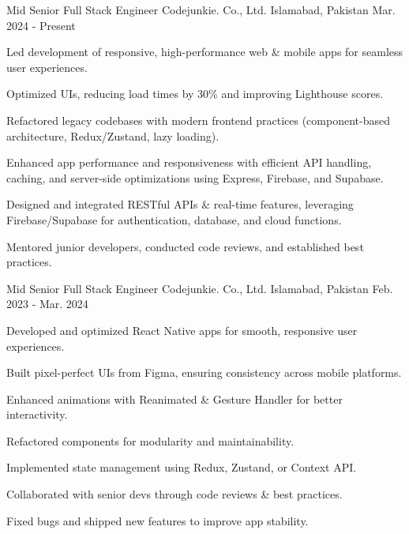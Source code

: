 

\begin{cventries}

  \cventry
    {Mid Senior Full Stack Engineer } %
    {Codejunkie. Co., Ltd.} %
    {Islamabad, Pakistan} %
    {Mar. 2024 - Present}%
    {
      \begin{cvitems} %
        \item {Led development of responsive, high-performance web \& mobile apps for seamless user experiences.}
        \item {Optimized UIs, reducing load times by 30\% and improving Lighthouse scores.}
        \item {Refactored legacy codebases with modern frontend practices (component-based architecture, Redux/Zustand, lazy loading).}
        \item {Enhanced app performance and responsiveness with efficient API handling, caching, and server-side optimizations using Express, Firebase, and Supabase.}
        \item {Designed and integrated RESTful APIs \& real-time features, leveraging Firebase/Supabase for authentication, database, and cloud functions.}
        \item {Mentored junior developers, conducted code reviews, and established best practices.}
      \end{cvitems}
    }

  \cventry
    {Mid Senior Full Stack Engineer } %
    {Codejunkie. Co., Ltd.} %
    {Islamabad, Pakistan} %
    {Feb. 2023 - Mar. 2024}%
    {
      \begin{cvitems} %
        \item {Developed and optimized React Native apps for smooth, responsive user experiences.}
        \item {Built pixel-perfect UIs from Figma, ensuring consistency across mobile platforms.}
        \item {Enhanced animations with Reanimated \& Gesture Handler for better interactivity.}
        \item {Refactored components for modularity and maintainability.}
        \item {Implemented state management using Redux, Zustand, or Context API.}
        \item {Collaborated with senior devs through code reviews \& best practices.}
        \item {Fixed bugs and shipped new features to improve app stability.}
      \end{cvitems}
    }


\end{cventries}
